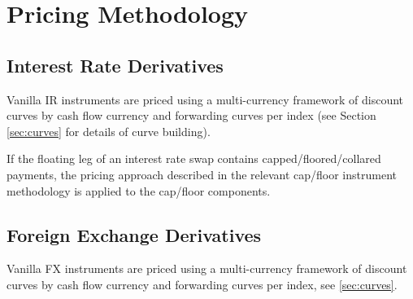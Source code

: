 \documentclass[12pt, a4paper]{article}
\begin{document}





\section{Pricing Methodology}
\label{sec:pricingmethods}


\subsection{Interest Rate Derivatives}
Vanilla IR instruments are priced using a multi-currency framework of discount 
curves by cash flow currency and forwarding curves per index (see Section 
\ref{sec:curves} for details of curve building). 

If the floating leg of an interest rate swap contains capped/floored/collared 
payments, the pricing approach described in the relevant cap/floor instrument 
methodology is applied to the cap/floor components.













%










\subsection{Foreign Exchange Derivatives}
Vanilla FX instruments are priced using a multi-currency framework of discount 
curves by cash flow currency and forwarding curves per index, see \ref{sec:curves}.
\end{document}
